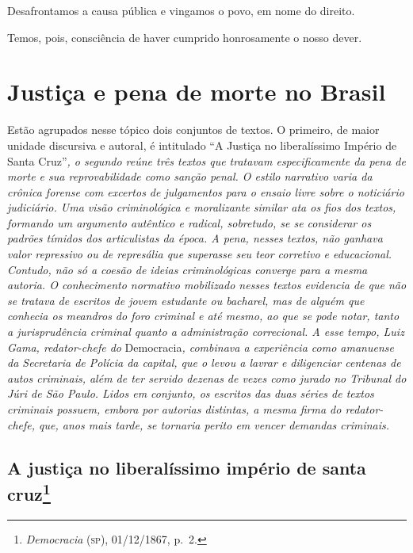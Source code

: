 Desafrontamos a causa pública e vingamos o povo, em nome do direito.

Temos, pois, consciência de haver cumprido honrosamente o nosso dever.

\part{Justiça e pena de morte no Brasil} %

\begin{argumento}
Estão agrupados nesse tópico dois conjuntos de textos. O primeiro, de
maior unidade discursiva e autoral, é intitulado ``A Justiça no
liberalíssimo Império de Santa Cruz''\emph{, o segundo reúne três textos
que tratavam especificamente da pena de morte e sua reprovabilidade como
sanção penal. O estilo narrativo varia da crônica forense com excertos
de julgamentos para o ensaio livre sobre o noticiário judiciário. Uma
visão criminológica e moralizante similar ata os fios dos textos,
formando um argumento autêntico e radical, sobretudo, se se considerar
os padrões tímidos dos articulistas da época. A pena, nesses textos, não
ganhava valor repressivo ou de represália que superasse seu teor
corretivo e educacional. Contudo, não só a coesão de ideias
criminológicas converge para a mesma autoria. O conhecimento normativo
mobilizado nesses textos evidencia de que não se tratava de escritos de
jovem estudante ou bacharel, mas de alguém que conhecia os meandros do
foro criminal e até mesmo, ao que se pode notar, tanto a jurisprudência
criminal quanto a administração correcional. A esse tempo, Luiz Gama,
redator-chefe do} Democracia\emph{, combinava a experiência como
amanuense da Secretaria de Polícia da capital, que o levou a lavrar e
diligenciar centenas de autos criminais, além de ter servido dezenas de
vezes como jurado no Tribunal do Júri de São Paulo. Lidos em conjunto,
os escritos das duas séries de textos criminais possuem, embora por
autorias distintas, a mesma firma do redator-chefe, que, anos mais
tarde, se tornaria perito em vencer demandas criminais.}
\end{argumento}

\chapter{A justiça no liberalíssimo império de santa cruz\footnote{\emph{Democracia} (\textsc{sp}), 01/12/1867, p.~2.}}

